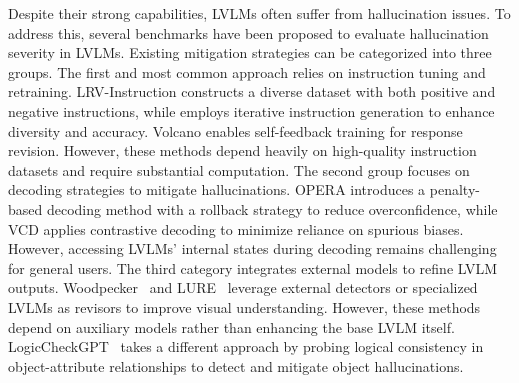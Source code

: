 Despite their strong capabilities, LVLMs often suffer from hallucination issues. To address this, several benchmarks \cite{fu2023mme, xu2023lvlm, Li-hallucination-2023, lovenia2023negative, jing2023faithscore, chen2024unified} have been proposed to evaluate hallucination severity in LVLMs. 
Existing mitigation strategies can be categorized into three groups. The first and most common approach \cite{liu2023mitigating, gunjal2023detecting, lee2023volcano, wang2023vigc} relies on instruction tuning and retraining. LRV-Instruction \cite{liu2023mitigating} constructs a diverse dataset with both positive and negative instructions, while \cite{wang2023vigc} employs iterative instruction generation to enhance diversity and accuracy. Volcano \cite{lee2023volcano} enables self-feedback training for response revision. However, these methods depend heavily on high-quality instruction datasets and require substantial computation.
The second group focuses on decoding strategies to mitigate hallucinations. OPERA \cite{huang2023opera} introduces a penalty-based decoding method with a rollback strategy to reduce overconfidence, while VCD \cite{leng2023mitigating} applies contrastive decoding to minimize reliance on spurious biases. However, accessing LVLMs' internal states during decoding remains challenging for general users.
The third category integrates external models to refine LVLM outputs. Woodpecker~\cite{yin2023woodpecker} and LURE~\cite{zhou2023analyzing} leverage external detectors or specialized LVLMs as revisors to improve visual understanding. 
However, these methods depend on auxiliary models rather than enhancing the base LVLM itself. 
LogicCheckGPT~\cite{wu2024logical} takes a different approach by probing logical consistency in object-attribute relationships to detect and mitigate object hallucinations.